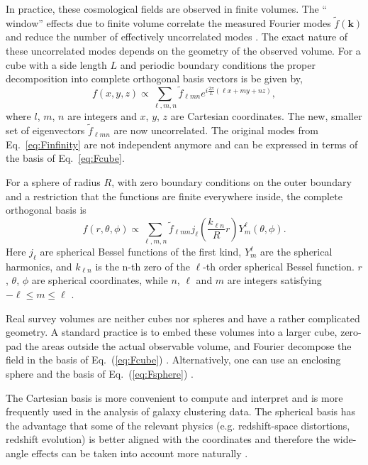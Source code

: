 \documentclass[fleqn,usenatbib]{mnras}
\begin{document}
In practice, these cosmological fields are observed in finite volumes. The ``
window'' effects due to finite volume correlate the measured Fourier modes
$\tilde{f}(\bm{k})$ and reduce the number of effectively uncorrelated modes
\citep{1991MNRAS.253..307P}.  The exact nature of these uncorrelated modes
depends on the geometry of the observed volume.  For a cube with a side length
$L$ and periodic boundary conditions the proper decomposition into complete
orthogonal basis vectors is be given by,
\begin{equation}
\label{eq:Fcube}
f(x,y,z)\propto
\displaystyle\sum_{\ell,m,n}\tilde{f}_{\ell m n}e^{i\frac{2\pi}{L}\left(\ell x
+ my + nz\right)},
\end{equation}
\noindent
where $l$, $m$, $n$ are integers and $x$, $y$, $z$ are Cartesian coordinates.
The new, smaller set of eigenvectors $\tilde{f}_{\ell m n}$ are now
uncorrelated. The original modes from Eq.~\eqref{eq:Finfinity} are not
independent anymore and can be expressed in terms of the basis of
Eq.~\eqref{eq:Fcube}.

For a sphere of radius $R$, with zero boundary conditions on the outer
boundary and a restriction that the functions are finite everywhere inside, the
complete orthogonal basis is
\begin{equation}
\label{eq:Fsphere}
f(r,\theta,\phi) \propto \displaystyle\sum_{\ell,m,n} \tilde{f}_{\ell m n}j_\ell\left(\frac{k_{\ell n}}
{R}r\right)Y^\ell_m
(\theta,\phi).
\end{equation}
\noindent
Here $j_\ell$ are spherical Bessel functions of the first kind, $Y^\ell_m$ are
the spherical harmonics, and $k_{\ell n}$ is the n-th zero of the $\ell$-th
order spherical Bessel function. $r$, $\theta$, $\phi$ are spherical
coordinates, while $n$, $\ell$ and $m$ are integers satisfying $-\ell \leq m
\leq \ell$ \citep[see e.g.,][]{1995MNRAS.275..483H}.

Real survey volumes are neither cubes nor spheres and have a rather complicated
geometry. A standard practice is to embed these volumes into a larger cube,
zero-pad the areas outside the actual observable volume, and Fourier decompose
the field in the basis of Eq.~(\ref{eq:Fcube})
\citep{1994ApJ...426...23F,1995ApJ...455..429T}.  Alternatively, one can use an
enclosing sphere and the basis of Eq.~(\ref{eq:Fsphere})
\citep{2012A&A...540A..60L}. 

The Cartesian basis is more convenient to compute and interpret and is more
frequently used in the analysis of galaxy clustering data. The spherical basis
has the advantage that some of the relevant physics (e.g. redshift-space
distortions, redshift evolution) is better aligned with the coordinates and
therefore the wide-angle effects can be taken into account more naturally
\citep{2015MNRAS.452.3704S,2015MNRAS.447.1789Y}.
\end{document}
